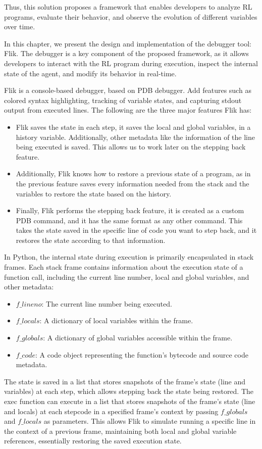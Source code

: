 Thus, this solution proposes a framework that enables developers to 
analyze RL programs, evaluate their behavior, and observe the evolution 
of different variables over time.

In this chapter, we present the design and implementation of the debugger tool: \ac{Flik}.
The debugger is a key component of the proposed framework, as it allows 
developers to interact with the RL program during execution, inspect the 
internal state of the agent, and modify its behavior in real-time.

\ac{Flik} is a console-based debugger, based on \ac{PDB} debugger. Add features 
such as colored syntax highlighting, tracking of variable states, and capturing stdout output 
from executed lines. The following are the three major features \ac{Flik} has:
\begin{itemize}
    \item \ac{Flik} saves the state in each step, it saves the local and global variables, 
    in a history variable. Additionally, other metadata like the information of the line 
    being executed is saved. This allows us to work later on the stepping back feature.
    \item Additionally, \ac{Flik} knows how to restore a previous state of a program, as 
    in the previous feature saves every information needed from the stack and the variables 
    to restore the state based on the history.
    \item Finally, \ac{Flik} performs the stepping back feature, it is created as a custom 
    \ac{PDB} command, and it has the same format as any other command. This takes the state
    saved in the specific line of code you want to step back, and it restores the state according
    to that information.
\end{itemize}

In Python, the internal state during execution is primarily encapsulated in 
stack frames. Each stack frame contains information about the execution state of a function 
call, including the current line number, local and global variables, and other metadata:
\begin{itemize}
    \item $f\_lineno$: The current line number being executed.
    \item $f\_locals$: A dictionary of local variables within the frame.
    \item $f\_globals$: A dictionary of global variables accessible within the frame.
    \item $f\_code$: A code object representing the function's bytecode and source code metadata.
\end{itemize}
The state is saved in a list that stores snapshots of the frame's state (line and variables) 
at each step, which allows stepping back the state being restored. The exec function can execute 
in a list that stores snapshots of the frame's state (line and locals) at each stepcode in a 
specified frame's context by passing $f\_globals$ and $f\_locals$ as parameters. This allows 
\ac{Flik} to simulate running a specific line in the context of a previous frame, maintaining 
both local and global variable references, essentially restoring the saved execution state.


